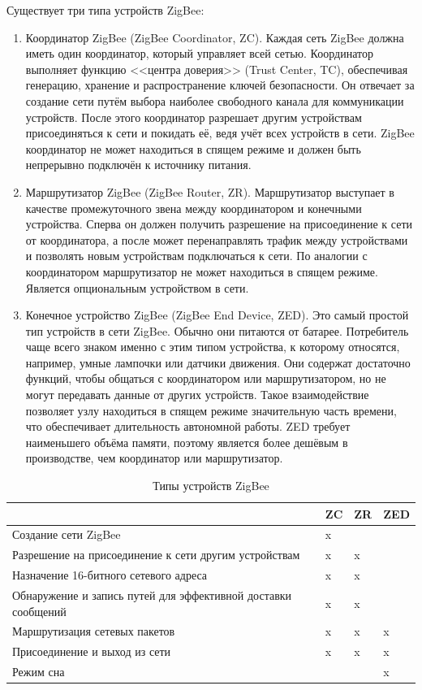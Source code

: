 	Существует три типа устройств ZigBee:
	
	\begin{enumerate}
		\item Координатор ZigBee (ZigBee Coordinator, ZC). Каждая сеть ZigBee должна иметь один координатор,
		который управляет всей сетью. Координатор выполняет функцию <<центра доверия>> (Trust Center, TC),
		обеспечивая генерацию, хранение и распространение ключей безопасности. Он отвечает за создание сети
		путём выбора наиболее свободного канала для коммуникации устройств. После этого координатор 
		разрешает другим устройствам присоединяться к сети и покидать её, ведя учёт всех устройств в сети.
		ZigBee координатор не может находиться в спящем режиме и должен быть непрерывно подключён
		к источнику питания.
		\item Маршрутизатор ZigBee (ZigBee Router, ZR). Маршрутизатор выступает в качестве промежуточного
		звена между координатором и конечными устройства. Сперва он должен получить разрешение на
		присоединение к сети от координатора, а после может перенаправлять трафик между устройствами и 
		позволять новым устройствам подключаться к сети. По аналогии с координатором маршрутизатор не
		может находиться в спящем режиме. Является опциональным устройством в сети.
		\item Конечное устройство ZigBee (ZigBee End Device, ZED). Это самый простой тип устройств в сети
		ZigBee. Обычно они питаются от батарее. Потребитель чаще всего знаком именно с этим типом
		устройства, к которому относятся, например, умные лампочки или датчики движения. Они содержат 
		достаточно функций, чтобы общаться с координатором или маршрутизатором, но не могут передавать 
		данные от других устройств. Такое взаимодействие позволяет узлу находиться в спящем режиме 
		значительную часть времени, что обеспечивает длительность автономной работы. ZED требует 
		наименьшего объёма памяти, поэтому является более дешёвым в производстве, чем координатор 
		или маршрутизатор.
	\end{enumerate}

	\begin{table}[h]
		\centering
		\begin{tabular}{ | p{9cm} | p{1cm} | p{1cm} | p{1cm} | }
			\hline
			& ZC & ZR & ZED \\ \hline
			Создание сети ZigBee & x &  &  \\ \hline
			Разрешение на присоединение к сети другим устройствам & x & x &  \\ \hline
			Назначение 16-битного сетевого адреса & x & x &  \\ \hline
			Обнаружение и запись путей для эффективной доставки сообщений & x & x &  \\ \hline
			Маршрутизация сетевых пакетов & x & x & x \\ \hline
			Присоединение и выход из сети & x & x & x \\ \hline
			Режим сна & & & x \\ \hline
		\end{tabular}
		\caption{Типы устройств ZigBee}
		\label{table-ZigBee-device-types}
	\end{table}
	
